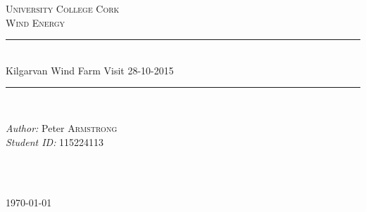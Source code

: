\documentclass[12pt]{article} %
\newlength{\wideitemsep}
\let\olditem\item
\renewcommand{\item}{\setlength{\itemsep}{\wideitemsep}\olditem}
\begin{document}

\begin{titlepage}
  \newcommand{\HRule}{\rule{\linewidth}{0.5mm}} %

  \center %

  \textsc{\LARGE University College Cork}\\[1.5cm] %
  \textsc{\Large Wind Energy}\\[0.5cm] %

  \HRule \\[0.4cm]
  { \huge Kilgarvan Wind Farm Visit 28-10-2015}\\[0.5cm] %
  \HRule \\[1.5cm]

  \begin{minipage}{0.4\textwidth}
  \begin{flushleft} \large
  \emph{Author:} Peter \textsc{Armstrong} \\%
  \emph{Student ID:} 115224113
  \end{flushleft}
  \end{minipage}
  ~
  \begin{minipage}{0.4\textwidth}
  \begin{flushright} \large
  \end{flushright}
  \end{minipage}\\[4cm]

  {\large \today}\\[3cm] %

  \vfill %

\newlength{\wideitemsep}
\setlength{\wideitemsep}{.5\itemsep}
\addtolength{\wideitemsep}{-7pt}
\let\olditem\item
\renewcommand{\item}{\setlength{\itemsep}{\wideitemsep}\olditem}

\end{titlepage}
\end{document}
